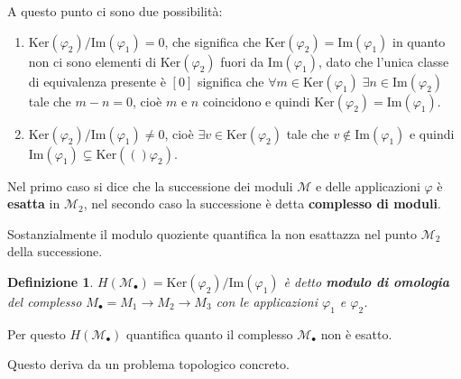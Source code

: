 \documentclass[10pt, twoside=false, x11names]{scrbook}
\newtheorem{definition}[theorem]{Definizione}
\newcommand{\M}{\mathcal{M}}
\newcommand{\im}[1]{\mathrm{Im}( #1 )}
\renewcommand{\ker}[1]{\mathrm{Ker}( #1)}
\renewcommand{\phi}{\varphi}
\begin{document}
A questo punto ci sono due possibilità:
\begin{enumerate}
\item $ {\ker {\phi_2}} \slash {\im{\phi_1}} = 0 $, che significa che $ \ker {\phi_2} = \im{\phi_1} $
  in quanto non ci sono elementi di $ \ker {\phi_2} $ fuori da $ \im{\phi_1} $, dato che l'unica
  classe di equivalenza presente è $ [0] $ significa che $ \forall m \in \ker{\phi_1} \; \exists n \in \im{\phi_2} $
  tale che $ m - n = 0 $, cioè $ m $ e $ n $ coincidono e quindi $ \ker {\phi_2} = \im{\phi_1} $.
\item $ {\ker {\phi_2}} \slash {\im{\phi_1}} \not= 0 $, cioè $ \exists v \in \ker {\phi_2} $
  tale che $ v \not \in \im {\phi_1} $ e quindi $ \im {\phi_1} \subsetneq \ker (\phi_2) $.
\end{enumerate}
Nel primo caso si dice che la successione dei moduli $ \M $ e delle
applicazioni $ \phi $ è \textbf{esatta} in $ \M_2$, nel secondo caso la
successione è detta \textbf{complesso di moduli}.

Sostanzialmente il modulo quoziente quantifica la non esattazza nel punto $ \M_2 $
della successione.

\begin{definition}
  $ H(\M_\bullet) = {\ker {\phi_2}} \slash {\im {\phi_1}} $ è detto \textbf{modulo di omologia} 
  del complesso $ M_\bullet = M_1 \longrightarrow M_2 \longrightarrow M_3 $ con le applicazioni $ \phi_1 $ e $ \phi_2 $.
\end{definition}
Per questo  $ H(\M_\bullet) $ quantifica quanto il complesso $ \M_\bullet $ non è esatto.

Questo deriva da un problema topologico concreto.
\end{document}

